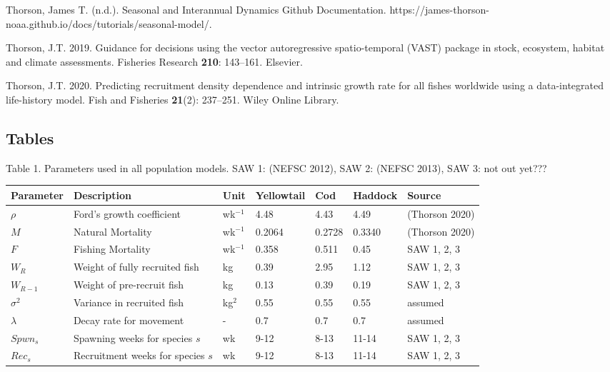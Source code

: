 \documentclass[
  12pt,
]{article}
\newlength{\cslhangindent}
\newlength{\cslentryspacingunit} %
\newenvironment{CSLReferences}[2] %
 {%
  \setlength{\parindent}{0pt}
  \ifodd #1
  \let\oldpar\par
  \def\par{\hangindent=\cslhangindent\oldpar}
  \fi
  \setlength{\parskip}{#2\cslentryspacingunit}
 }%
 {}
\begin{document}
\begin{CSLReferences}{1}{0}
\leavevmode{}%
Thorson, James T. (n.d.). {Seasonal and Interannual Dynamics Github Documentation}. {https://james-thorson-noaa.github.io/docs/tutorials/seasonal-model/}.

\leavevmode{}%
Thorson, J.T. 2019. Guidance for decisions using the vector autoregressive spatio-temporal (VAST) package in stock, ecosystem, habitat and climate assessments. Fisheries Research \textbf{210}: 143--161. Elsevier.

\leavevmode{}%
Thorson, J.T. 2020. Predicting recruitment density dependence and intrinsic growth rate for all fishes worldwide using a data-integrated life-history model. Fish and Fisheries \textbf{21}(2): 237--251. Wiley Online Library.

\end{CSLReferences}

\pagebreak

\hypertarget{tables}{%
\subsection{Tables}\label{tables}}

\pagebreak

Table 1. Parameters used in all population models. SAW 1: (NEFSC 2012), SAW 2: (NEFSC 2013), SAW 3: not out yet???

\begin{longtable}[]{@{}lllllll@{}}
\toprule
Parameter & Description & Unit & Yellowtail & Cod & Haddock & Source \\
\midrule
\endhead
\(\rho\) & Ford's growth coefficient & wk\(^{-1}\) & 4.48 & 4.43 & 4.49 & (Thorson 2020) \\
\(M\) & Natural Mortality & wk\(^{-1}\) & 0.2064 & 0.2728 & 0.3340 & (Thorson 2020) \\
\(F\) & Fishing Mortality & wk\(^{-1}\) & 0.358 & 0.511 & 0.45 & SAW 1, 2, 3 \\
\(W_R\) & Weight of fully recruited fish & kg & 0.39 & 2.95 & 1.12 & SAW 1, 2, 3 \\
\(W_{R-1}\) & Weight of pre-recruit fish & kg & 0.13 & 0.39 & 0.19 & SAW 1, 2, 3 \\
\(\sigma^2\) & Variance in recruited fish & kg\(^2\) & 0.55 & 0.55 & 0.55 & assumed \\
\(\lambda\) & Decay rate for movement & - & 0.7 & 0.7 & 0.7 & assumed \\
\(Spwn_s\) & Spawning weeks for species \(s\) & wk & 9-12 & 8-13 & 11-14 & SAW 1, 2, 3 \\
\(Rec_s\) & Recruitment weeks for species \(s\) & wk & 9-12 & 8-13 & 11-14 & SAW 1, 2, 3 \\
\bottomrule
\end{longtable}
\end{document}
